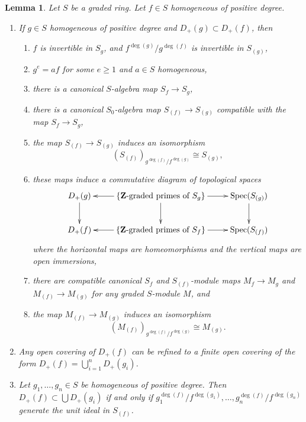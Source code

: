 \documentclass{stacks-project}
\theoremstyle{plain}
\newtheorem{lemma}[subsection]{Lemma}
\theoremstyle{definition}
\theoremstyle{remark}
\numberwithin{equation}{subsection}
\def\Spec{\mathop{\mathrm{Spec}}}
\begin{document}
\begin{lemma}
\label{lemma-standard-open}
Let $S$ be a graded ring. Let $f \in S$ homogeneous of positive degree.
\begin{enumerate}
\item If $g\in S$ homogeneous of positive degree
and $D_{+}(g) \subset D_{+}(f)$, then
\begin{enumerate}
\item $f$ is invertible in $S_g$, and
$f^{\deg(g)}/g^{\deg(f)}$ is invertible in $S_{(g)}$,
\item $g^e = af$ for some $e \geq 1$ and $a \in S$ homogeneous,
\item there is a canonical $S$-algebra map $S_f \to S_g$,
\item there is a canonical $S_0$-algebra map $S_{(f)} \to S_{(g)}$
compatible with the map $S_f \to S_g$,
\item the map $S_{(f)} \to S_{(g)}$ induces an isomorphism
$$
(S_{(f)})_{g^{\deg(f)}/f^{\deg(g)}} \cong S_{(g)},
$$
\item these maps induce a commutative diagram of
topological spaces
$$
\xymatrix{
D_{+}(g) \ar[d] &
\{\mathbf{Z}\text{-graded primes of }S_g\} \ar[l] \ar[r] \ar[d] &
\Spec(S_{(g)}) \ar[d] \\
D_{+}(f) &
\{\mathbf{Z}\text{-graded primes of }S_f\} \ar[l] \ar[r] &
\Spec(S_{(f)})
}
$$
where the horizontal maps are homeomorphisms and the vertical maps
are open immersions,
\item there are compatible canonical $S_f$ and $S_{(f)}$-module
maps $M_f \to M_g$ and $M_{(f)} \to M_{(g)}$ for any graded $S$-module $M$,
and
\item the map $M_{(f)} \to M_{(g)}$ induces an isomorphism
$$
(M_{(f)})_{g^{\deg(f)}/f^{\deg(g)}} \cong M_{(g)}.
$$
\end{enumerate}
\item Any open covering of $D_{+}(f)$ can be refined to a finite
open covering of the form $D_{+}(f) = \bigcup_{i = 1}^n D_{+}(g_i)$.
\item Let $g_1, \ldots, g_n \in S$ be homogeneous of positive degree.
Then $D_{+}(f) \subset \bigcup D_{+}(g_i)$
if and only if
$g_1^{\deg(f)}/f^{\deg(g_1)}, \ldots, g_n^{\deg(f)}/f^{\deg(g_n)}$
generate the unit ideal in $S_{(f)}$.
\end{enumerate}
\end{lemma}
\end{document}

